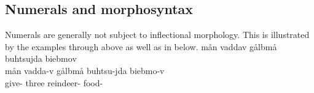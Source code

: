 \subsection{Numerals and morphosyntax}\label{caseNumberOnNum}%
Numerals are generally not subject to inflectional morphology. %
This is illustrated by the examples  through  above as well as in  below. %
\ea\label{numeralEx3b}%
\glll	mån vaddav gålbmå buhtsujda biebmov\\
	mån vadda-v gålbmå buhtsu-jda biebmo-v\\
	 give- three reindeer- food-\\\nopagebreak
{}	
\z

